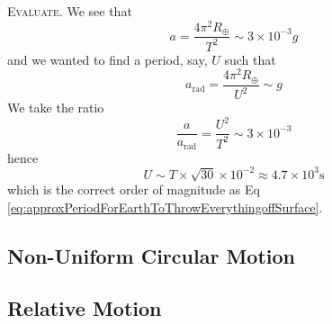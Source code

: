 \textsc{Evaluate.} We see that
\begin{equation}
a=\frac{4\pi^{2}R_{\oplus}}{T^{2}}\sim3\times10^{-3}g
\end{equation}
and we wanted to find a period, say, $U$ such that
\begin{equation}
a_{\text{rad}} = \frac{4\pi^{2}R_{\oplus}}{U^{2}}\sim g
\end{equation}
We take the ratio
\begin{equation}
\frac{a}{a_{\text{rad}}}=\frac{U^{2}}{T^{2}}\sim3\times10^{-3}
\end{equation}
hence
\begin{equation}
U\sim T\times\sqrt{30}\times10^{-2} \approx 4.7\times10^{3}\si{\second}
\end{equation}
which is the correct order of magnitude as Eq \eqref{eq:approxPeriodForEarthToThrowEverythingoffSurface}.


\subsection{Non-Uniform Circular Motion}

\subsection{Relative Motion}
